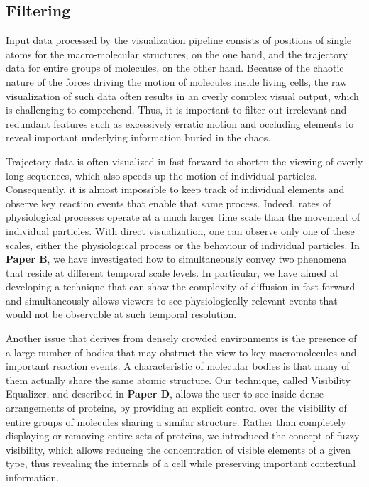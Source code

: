\subsection{Filtering}

Input data processed by the visualization pipeline consists of positions of single atoms for the macro-molecular structures, on the one hand, and the trajectory data for entire groups of molecules, on the other hand.
Because of the chaotic nature of the forces driving the motion of molecules inside living cells, the raw visualization of such data often results in an overly complex visual output, which is challenging to comprehend.
Thus, it is important to filter out irrelevant and redundant features such as excessively erratic motion and occluding elements to reveal important underlying information buried in the chaos.

Trajectory data is often visualized in fast-forward to shorten the viewing of overly long sequences, which also speeds up the motion of individual particles.
Consequently, it is almost impossible to keep track of individual elements and observe key reaction events that enable that same process. 
Indeed, rates of physiological processes operate at a much larger time scale than the movement of individual particles.
With direct visualization, one can observe only one of these scales, either the physiological process or the behaviour of individual particles.
In \textbf{Paper B}, we have investigated how to simultaneously convey two phenomena that reside at different temporal scale levels. 
In particular, we have aimed at developing a technique that can show the complexity of diffusion in fast-forward and simultaneously allows viewers to see physiologically-relevant events that would not be observable at such temporal resolution.

Another issue that derives from densely crowded environments is the presence of a large number of bodies that may obstruct the view to key macromolecules and important reaction events. 
A characteristic of molecular bodies is that many of them actually share the same atomic structure.
Our technique, called Visibility Equalizer, and described in \textbf{Paper D}, allows the user to see inside dense arrangements of proteins, by providing an explicit control over the visibility of entire groups of molecules sharing a similar structure. 
Rather than completely displaying or removing entire sets of proteins, we introduced the concept of fuzzy visibility, which allows reducing the concentration of visible elements of a given type, thus revealing the internals of a cell while preserving important contextual information.


